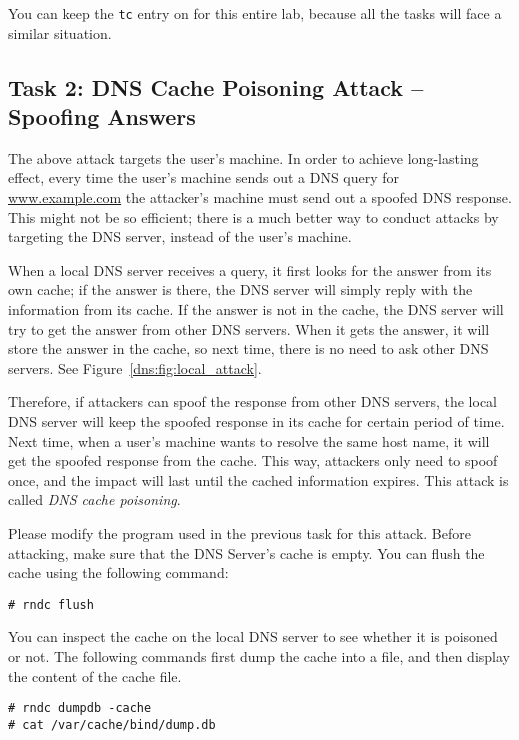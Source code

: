 You can keep the \texttt{tc} entry on for this entire lab, because 
all the tasks will face a similar situation. 


\subsection{Task 2: DNS Cache Poisoning Attack -- Spoofing Answers}

The above attack targets the user's machine. In order to achieve long-lasting
effect, every time the user's machine sends out a DNS query for
\url{www.example.com}
the attacker's machine must send out a spoofed DNS response. 
This might not be so efficient; there is a much better way to conduct attacks 
by targeting the DNS server, instead of the user's machine.


When a local DNS server receives a query, 
it first looks 
for the answer from its own cache; if the answer is there, 
the DNS server will simply reply with the information from its cache. 
If the answer is not in the cache, the DNS server will 
try to get the answer from other DNS servers. When it gets the 
answer, it will store the answer in the cache, so next time, 
there is no need to ask other DNS servers. See Figure~\ref{dns:fig:local_attack}. 

Therefore, if attackers can spoof the response from other DNS 
servers, the local DNS server will keep the spoofed response in its cache for 
certain period of time. Next time, when a user's machine wants to resolve the 
same host name, it will get the spoofed response from the cache. 
This way, attackers only need to spoof once, and 
the impact will last until the cached information expires. 
This attack is called {\em DNS cache poisoning}.  


Please modify the program used in the previous task for this attack. 
Before attacking, 
make sure that the DNS Server's cache is empty. 
You can flush the cache using the following command:

\begin{lstlisting}
# rndc flush
\end{lstlisting}

You can inspect the cache on the local DNS server to
see whether it is poisoned or not. The following commands
first dump the cache into a file, and then
display the content of the cache file. 

\begin{lstlisting}
# rndc dumpdb -cache
# cat /var/cache/bind/dump.db
\end{lstlisting}



